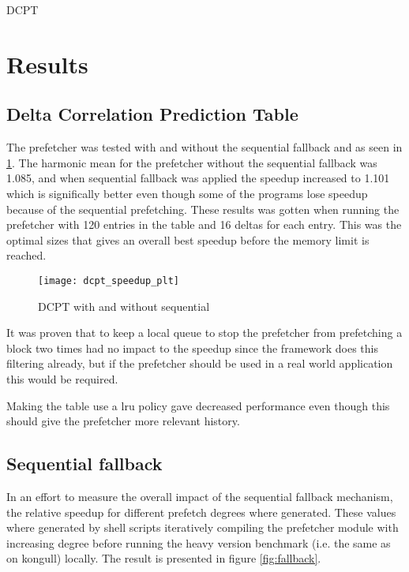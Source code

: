 \documentclass[12pt,journal,compsoc]{IEEEtran}
\begin{document}
\begin{algorithm}[H]
\dontprintsemicolon
{}

\caption{DCPT\label{dcpt}}
\end{algorithm}



\section{Results}
\subsection{Delta Correlation Prediction Table}
The prefetcher was tested with and without the sequential fallback and as seen in \ref{fig:dcptspeed}. The harmonic mean for the prefetcher without the sequential fallback was 1.085, and when sequential fallback was applied the speedup increased to 1.101 which is significally better even though some of the programs lose speedup because of the sequential prefetching. These results was gotten when running the prefetcher with 120 entries in the table and 16 deltas for each entry. This was the optimal sizes that gives an overall best speedup before the memory limit is reached.

\begin{figure}[H]
\begin{center}
\texttt{[image: dcpt\_speedup\_plt]}
\end{center}
\caption{\label{fig:dcptspeed} DCPT with and without sequential}
\end{figure}

It was proven that to keep a local queue to stop the prefetcher from prefetching a block two times had no impact to the speedup since the framework does this filtering already, but if the prefetcher should be used in a real world application this would be required.

Making the table use a lru policy gave decreased performance even though this should give the prefetcher more relevant history.

\subsection{Sequential fallback}
In an effort to measure the overall impact of the sequential fallback
mechanism, the relative speedup for different prefetch degrees where
generated. These values where generated by shell scripts iteratively
compiling the prefetcher module with increasing degree before running
the heavy version benchmark (i.e. the same as on kongull) locally. The
result is presented in figure \ref{fig:fallback}.
\end{document}
